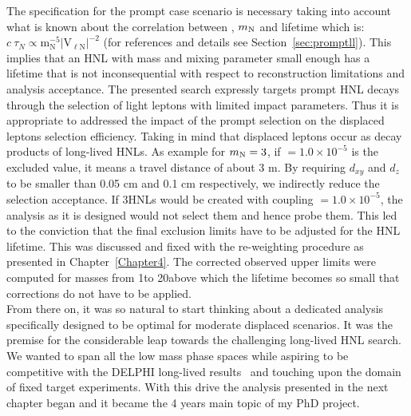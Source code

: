 The specification for the prompt case scenario is necessary taking
into account what is known about the correlation between \mixpar, $
m_\mathrm{N} $ and \hnl lifetime which is: $c\:\tau_{N}
\propto\mathrm{m_{N}^{-5}|V_{\ell N}|^{-2}}$ (for references and
details see Section~\ref{sec:promptll}). This implies that an HNL with
mass and mixing parameter small enough has a lifetime that
is not inconsequential with respect to reconstruction limitations and 
analysis acceptance. The presented search expressly targets prompt
HNL decays through the selection of light leptons with 
limited impact parameters. Thus it is appropriate to addressed the impact of the
prompt selection on the displaced leptons selection
efficiency. Taking in mind that displaced leptons occur as decay
products of long-lived HNLs. As example for $m_\mathrm{N} = 3$\GeV, if
\mixparm $= 1.0\times 10^{-5}$ is the excluded value, it means a travel distance
of about 3 m. By requiring $d_{xy}$ and $d_z$ to
be smaller than 0.05 cm and 0.1 cm respectively, we indirectly reduce
the selection acceptance. If 3\GeV HNLs would be created with
coupling \mixparm $= 1.0\times 10^{-5}$, the analysis as it is
designed would not select them and hence probe them. This led to the conviction that the final
exclusion limits have to be adjusted for the HNL lifetime. This was
discussed and fixed with the re-weighting procedure as presented in
Chapter~\ref{Chapter4}. The corrected observed upper limits were
computed for masses from 1\GeV to 20\GeV above which the lifetime
becomes so small that corrections do not have to be applied.\\
From there on, it was so natural to start thinking about a dedicated
analysis specifically designed to be optimal for moderate displaced scenarios. It
was the premise for the considerable leap towards the
challenging long-lived HNL search. We wanted to span all the
low mass phase spaces while aspiring to be competitive with the DELPHI
long-lived results~\cite{Abreu:1996pa} and touching upon the domain of
fixed target experiments. With this drive the analysis presented in
the next chapter began and it became the 4 years main topic of my PhD
project.\\


